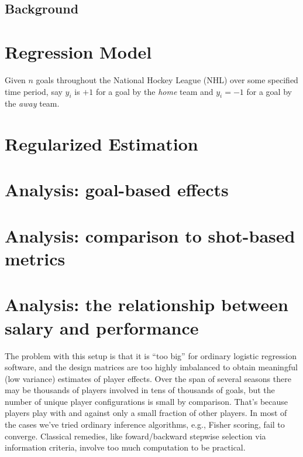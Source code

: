 \subsection{Background}
\label{sec:background}

\section{Regression Model}
\label{sec:regression}

Given $n$ goals throughout the National Hockey League (NHL) over some
specified time period,  say $y_i$ is $+1$ for a goal by the \textit{home} team
and $y_i = -1$ for a goal by the \textit{away} team.

\section{Regularized Estimation}
\label{sec:regularization}

\section{Analysis: goal-based effects}
\label{sec:goals}

\section{Analysis: comparison to shot-based metrics}
\label{sec:shots}

\section{Analysis: the relationship between salary and performance}
\label{sec:salary}

The problem with this setup is that it is ``too big'' for ordinary logistic
regression software, and the design matrices are too highly imbalanced to
obtain meaningful (low variance) estimates of player effects.  Over the span
of several seasons there may be thousands of players involved in tens of
thousands of goals, but the number of unique player configurations is small by
comparison. That's because players play with and against only a small fraction
of other players.  In most of the cases we've tried ordinary inference
algorithms, e.g., Fisher scoring, fail to converge.  Classical remedies, like
foward/backward stepwise selection via information criteria, involve too much
computation to be practical.

